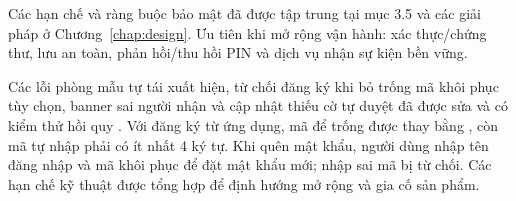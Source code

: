 Các hạn chế và ràng buộc bảo mật đã được tập trung tại mục 3.5 và các giải pháp ở Chương~\ref{chap:design}. Ưu tiên khi mở rộng vận hành: xác thực/chứng thư, lưu an toàn, phản hồi/thu hồi PIN và dịch vụ nhận sự kiện bền vững.

Các lỗi phòng mẫu tự tái xuất hiện, từ chối đăng ký khi bỏ trống mã khôi phục tùy chọn, banner sai người nhận và cập nhật thiếu cờ tự duyệt đã được sửa và có kiểm thử hồi quy \cite{qualityreport}. Với đăng ký từ ứng dụng, mã để trống được thay bằng , còn mã tự nhập phải có ít nhất 4 ký tự. Khi quên mật khẩu, người dùng nhập tên đăng nhập và mã khôi phục để đặt mật khẩu mới; nhập sai mã bị từ chối. Các hạn chế kỹ thuật được tổng hợp để định hướng mở rộng và gia cố sản phẩm.
